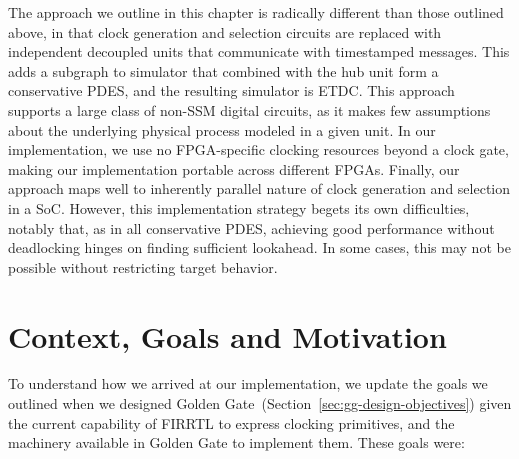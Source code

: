 The approach we outline in this chapter is radically different than those
outlined above, in that clock generation and selection circuits are replaced
with independent decoupled units that communicate with timestamped messages.
This adds a subgraph to simulator that combined with the hub unit form a
conservative PDES, and the resulting simulator is ETDC. This approach supports
a large class of non-SSM digital circuits, as it makes few assumptions about
the underlying physical process modeled in a given unit.  In our
implementation, we use no FPGA-specific clocking resources beyond a clock gate,
making our implementation portable across different FPGAs. Finally, our
approach maps well to inherently parallel nature of clock generation and
selection in a SoC. However, this implementation strategy begets its own
difficulties, notably that, as in all conservative PDES, achieving good
performance without deadlocking hinges on finding sufficient lookahead. In some
cases, this may not be possible without restricting target behavior.

\section{Context, Goals and Motivation}

To understand how we arrived at our implementation, we update the
goals we outlined when we designed Golden Gate~(Section~\ref{sec:gg-design-objectives}) given the current capability
of FIRRTL to express clocking primitives, and the machinery available in Golden
Gate to implement them. These goals were:

